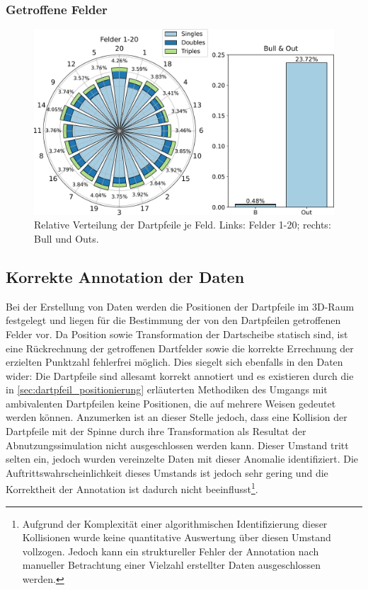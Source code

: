 \subsubsection{Getroffene Felder}
\label{sec:felder_ergebnisse}

\begin{figure}
    \centering
    \includegraphics[width=\textwidth]{imgs/rendering/ergebnisse/dartboard_stacked_final.pdf}
    \caption{Relative Verteilung der Dartpfeile je Feld. Links: Felder 1-20; rechts: Bull und Outs.}
    \label{img:dart_verteilung}
\end{figure}


\subsection{Korrekte Annotation der Daten}  %
\label{sec:korrekte_annotation}  %

Bei der Erstellung von Daten werden die Positionen der Dartpfeile im 3D-Raum festgelegt und liegen für die Bestimmung der von den Dartpfeilen getroffenen Felder vor. Da Position sowie Transformation der Dartscheibe statisch sind, ist eine Rückrechnung der getroffenen Dartfelder sowie die korrekte Errechnung der erzielten Punktzahl fehlerfrei möglich. Dies siegelt sich ebenfalls in den Daten wider: Die Dartpfeile sind allesamt korrekt annotiert und es existieren durch die in \autoref{sec:dartpfeil_positionierung} erläuterten Methodiken des Umgangs mit ambivalenten Dartpfeilen keine Positionen, die auf mehrere Weisen gedeutet werden können. Anzumerken ist an dieser Stelle jedoch, dass eine Kollision der Dartpfeile mit der Spinne durch ihre Transformation als Resultat der Abnutzungssimulation nicht ausgeschlossen werden kann. Dieser Umstand tritt selten ein, jedoch wurden vereinzelte Daten mit dieser Anomalie identifiziert. Die Auftrittswahrscheinlichkeit dieses Umstands ist jedoch sehr gering und die Korrektheit der Annotation ist dadurch nicht beeinflusst\footnote{Aufgrund der Komplexität einer algorithmischen Identifizierung dieser Kollisionen wurde keine quantitative Auswertung über diesen Umstand vollzogen. Jedoch kann ein struktureller Fehler der Annotation nach manueller Betrachtung einer Vielzahl erstellter Daten ausgeschlossen werden.}.

